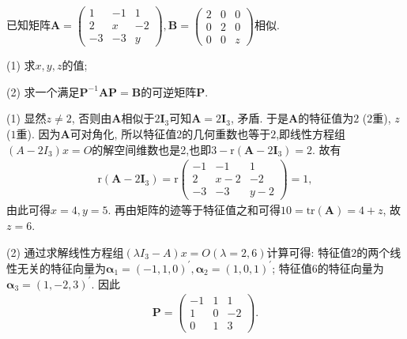 \documentclass[../../main.tex]{subfiles}%
\begin{document}
\begin{example}
已知矩阵\(\boldsymbol{A}=\begin{pmatrix}
1&-1&1\\
2&x&-2\\
-3&-3&y
\end{pmatrix},\boldsymbol{B}=\begin{pmatrix}
2&0&0\\
0&2&0\\
0&0&z
\end{pmatrix}\)相似.

(1) 求\(x,y,z\)的值;

(2) 求一个满足\(\boldsymbol{P}^{-1}\boldsymbol{AP}=\boldsymbol{B}\)的可逆矩阵\(\boldsymbol{P}\). 
\end{example}
\begin{solution}
(1) 显然\(z\neq 2\), 否则由\(\boldsymbol{A}\)相似于\(2\boldsymbol{I}_{3}\)可知\(\boldsymbol{A}=2\boldsymbol{I}_{3}\), 矛盾. 于是\(\boldsymbol{A}\)的特征值为\(2\) (\(2\)重), \(z\) (\(1\)重). 因为\(\boldsymbol{A}\)可对角化, 所以特征值\(2\)的几何重数也等于\(2\),即线性方程组$(A-2I_3)x=O$的解空间维数也是2,也即$3-\mathrm{r}(\boldsymbol{A}-2\boldsymbol{I}_{3})=2$. 故有
\begin{align*}
\mathrm{r}(\boldsymbol{A}-2\boldsymbol{I}_{3})=\mathrm{r}\begin{pmatrix}
-1&-1&1\\
2&x - 2&-2\\
-3&-3&y - 2
\end{pmatrix}=1,
\end{align*}
由此可得\(x = 4,y = 5\). 再由矩阵的迹等于特征值之和可得\(10=\mathrm{tr}(\boldsymbol{A})=4 + z\), 故\(z = 6\).

(2) 通过求解线性方程组$(\lambda I_3-A)x=O(\lambda=2,6)$计算可得: 特征值\(2\)的两个线性无关的特征向量为\(\boldsymbol{\alpha}_{1}=(-1,1,0)^{\prime},\boldsymbol{\alpha}_{2}=(1,0,1)^{\prime}\); 特征值\(6\)的特征向量为\(\boldsymbol{\alpha}_{3}=(1,-2,3)^{\prime}\). 因此
\begin{align*}
\boldsymbol{P}=\begin{pmatrix}
-1&1&1\\
1&0&-2\\
0&1&3
\end{pmatrix}. 
\end{align*}

\end{solution}
\end{document}
